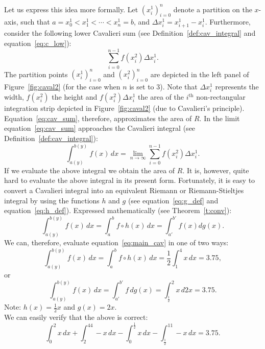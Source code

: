 \documentclass[twoside,reqno,11pt]{fcaa-var} %
\begin{document}
\noindent
Let us express this idea more formally. Let $(x_i^1)_{i=0}^{n}$ denote a partition on the $x$-axis, such that $a = x_0^1 < x_1^1 < \cdots < x_n^1 = b$, and $\Delta x_i^1 = x_{i+1}^1 - x_i^1$. Furthermore, consider the following lower Cavalieri sum (see Definition~\ref{def:cav_integral} and equation~\ref{eq:c_low}):
\begin{equation}
\label{eq:cav_sum}
\sum_{i=0}^{n-1} f(x_i^2)\Delta x_i^1.
\end{equation}
The partition points $(x_i^1)_{i=0}^{n}$ and $(x_i^2)_{i=0}^{n}$ are depicted in the left panel of Figure~\ref{fig:caval2} (for the case when $n$ is set to 3). Note that $\Delta x_i^1$ represents the width, $f(x_i^2)$ the height and $f(x_i^2)\Delta x_i^1$ the area of the $i^{\textrm{th}}$ non-rectangular integration strip depicted in Figure~\ref{fig:caval2} (due to Cavalieri's principle). Equation~\eqref{eq:cav_sum}, therefore, approximates the area of $R$. In the limit equation~\eqref{eq:cav_sum} approaches 
the Cavalieri integral (see Definition~\ref{def:cav_integral}):
\begin{equation}
\label{eq:caval1}
\int_{a(y)}^{b(y)}f(x)\, dx = \lim_{n\to \infty}\sum_{i=0}^{n-1} f(x_i^2)\Delta x_i^1.
\end{equation}
If we evaluate the above integral we obtain the area of $R$. It is, however, quite hard to evaluate the above integral in its present form. Fortunately, it is easy to convert a Cavalieri integral into an equivalent Riemann or Riemann-Stieltjes 
integral by using the functions $h$ and $g$ (see equation~\eqref{eq:g_def} and equation~\eqref{eq:h_def}). Expressed mathematically (see Theorem~\ref{t:conv}):
\begin{equation}
\label{eq:main_cav}
\int_{a(y)}^{b(y)}f(x)\,dx =\int_a^b f \circ h (x)\, dx = \int_{a'}^{b'} f(x) dg(x).
\end{equation}
We can, therefore, evaluate equation~\eqref{eq:main_cav} in one of two ways:
\begin{equation}
\int_{a(y)}^{b(y)}f(x)\, dx = \int_a^b f \circ h (x)\, dx = \dfrac{1}{2}\int_1^4x\, dx = 3.75,  
\end{equation}
or
\begin{equation}
\int_{a(y)}^{b(y)}f(x)\, dx = \int_{a'}^{b'} f \, dg(x) = \int_{\frac{1}{2}}^2x\, d2x = 3.75.  
\end{equation}
Note: $h(x) = \frac{1}{2}x$ and $g(x) = 2x$.\\ 

\noindent
We can easily verify that the above is correct:
\begin{equation}
\int_0^2x\, dx+\int_2^44-x\, dx- \int_0^{\frac{1}{2}}x\, dx-\int_{\frac{1}{2}}^11-x\, dx = 3.75. 
\end{equation}
\end{document}
